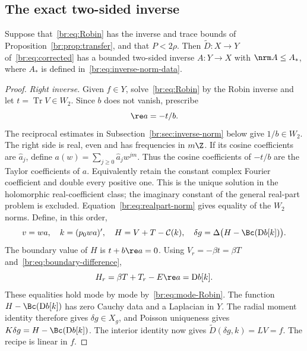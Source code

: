\subsection{The exact two-sided inverse}\label{br:sec:two-sided}
\begin{proposition}\label{br:prop:inverse}
Suppose that~\eqref{br:eq:Robin} has the inverse and trace bounds of
Proposition~\ref{br:prop:transfer}, and that $P<2\rho$. Then
$\widetilde D\colon X\to Y$ of~\eqref{br:eq:corrected} has a bounded
two-sided inverse $A\colon Y\to X$ with $\nrm A\le A_*$, where $A_*$
is defined in~\eqref{br:eq:inverse-norm-data}.
\end{proposition}
\begin{proof}
\emph{Right inverse.}
Given $f\in Y$, solve~\eqref{br:eq:Robin} by the Robin inverse and let
$t=\operatorname{Tr}V\in W_2$. Since $b$ does not vanish, prescribe
\begin{equation}\label{br:eq:shape-recovery}
 \re a=-t/b.
\end{equation}
The reciprocal estimates in Subsection~\ref{br:sec:inverse-norm} below
give $1/b\in W_2$. The right side is real, even and has frequencies in
$m\Z$. If its cosine coefficients are $\widehat a_j$, define
$a(w)=\sum_{j\ge0}\widehat a_jw^{jm}$. Thus the cosine coefficients of
$-t/b$ are the Taylor coefficients of $a$. Equivalently retain the
constant complex Fourier coefficient and double every positive one.
This is the unique solution in the holomorphic real-coefficient class;
the imaginary constant of the general real-part problem is excluded.
Equation~\eqref{br:eq:realpart-norm} gives equality of the $W_2$ norms.
Define, in this order,
\begin{equation}\label{br:eq:inverse-recipe}
 v=wa,\quad k=(p_0wa)',\quad
 H=V+T-\mathcal C(k),\quad
 \delta g=\Delta\bigl(H-\Bc(\mathrm Db[k])\bigr).
\end{equation}
The boundary value of $H$ is $t+b\re a=0$. Using
$V_r=-\beta t=\beta T$ and~\eqref{br:eq:boundary-difference},
\[
 H_r=\beta T+T_r-E\re a=\mathrm Db[k].
\]
These equalities hold mode by mode by~\eqref{br:eq:mode-Robin}.
The function $H-\Bc(\mathrm Db[k])$ has zero Cauchy data and a Laplacian
in $Y$. The radial moment identity therefore gives $\delta g\in X_g$,
and Poisson uniqueness gives
$K\delta g=H-\Bc(\mathrm Db[k])$.
The interior identity now gives
$\widetilde D(\delta g,k)=LV=f$. The recipe is linear in $f$.


\end{proof}
